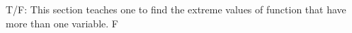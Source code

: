 {T/F: This section teaches one to find the extreme values of function that have more than one variable.
}
{F
}

